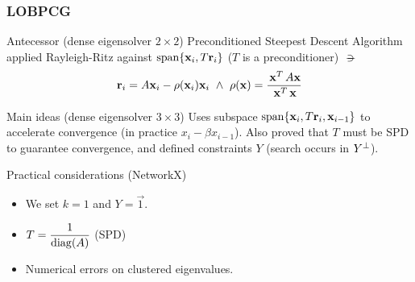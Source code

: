  \begin{frame}
  \frametitle{LOBPCG}
  \begin{block}{Antecessor (dense eigensolver $2 \times 2$)}
    Preconditioned Steepest Descent Algorithm applied Rayleigh-Ritz
    against $\operatorname{span} \{\mathbf{x}_i, T\mathbf{r}_i\}$
    ($T$ is a preconditioner) $\suchthat$
    \[
    \joinabove{0}
    \vec{r}_i = A\vec{x}_i - \func{\rho}(\vec{x}_i)\vec{x}_i
    \ds{\land}
    \func{\rho}(\vec{x}) = \dfrac{\trans{\vec{x}}A\vec{x}}{\trans{\vec{x}}\vec{x}}
    \joinbelow{0}
    \]
  \end{block}
  \begin{block}{Main ideas (dense eigensolver $3 \times 3$)}
    Uses subspace $\operatorname{span} \{\mathbf{x}_i, T\mathbf{r}_i, \mathbf{x}_{i-1}\}$ to
    accelerate convergence (in practice $x_{i} - \beta x_{i-1}$). Also
    proved that $T$ must be SPD to guarantee convergence, and defined
    constraints $Y$ (search occurs in ${Y}^{\bot}$).
  \end{block}
  \begin{block}{Practical considerations (NetworkX)}
    \begin{itemize}
    \item We set $k=1$ and $Y = \vec{1}$.
    \item $T = \dfrac{1}{\operatorname{diag}(A)}$ (SPD)
    \item Numerical errors on clustered eigenvalues.
    \end{itemize}
  \end{block}
\end{frame}
